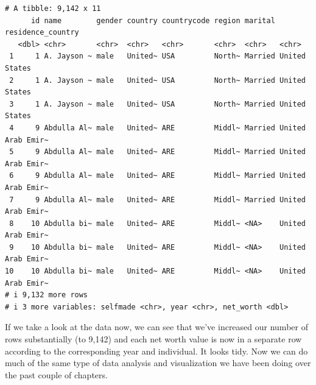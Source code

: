 \documentclass[
  letterpaper,
]{book}
\begin{document}
\begin{verbatim}
# A tibble: 9,142 x 11
      id name        gender country countrycode region marital residence_country
   <dbl> <chr>       <chr>  <chr>   <chr>       <chr>  <chr>   <chr>            
 1     1 A. Jayson ~ male   United~ USA         North~ Married United States    
 2     1 A. Jayson ~ male   United~ USA         North~ Married United States    
 3     1 A. Jayson ~ male   United~ USA         North~ Married United States    
 4     9 Abdulla Al~ male   United~ ARE         Middl~ Married United Arab Emir~
 5     9 Abdulla Al~ male   United~ ARE         Middl~ Married United Arab Emir~
 6     9 Abdulla Al~ male   United~ ARE         Middl~ Married United Arab Emir~
 7     9 Abdulla Al~ male   United~ ARE         Middl~ Married United Arab Emir~
 8    10 Abdulla bi~ male   United~ ARE         Middl~ <NA>    United Arab Emir~
 9    10 Abdulla bi~ male   United~ ARE         Middl~ <NA>    United Arab Emir~
10    10 Abdulla bi~ male   United~ ARE         Middl~ <NA>    United Arab Emir~
# i 9,132 more rows
# i 3 more variables: selfmade <chr>, year <chr>, net_worth <dbl>
\end{verbatim}

If we take a look at the data now, we can see that we've increased our
number of rows substantially (to 9,142) and each net worth value is now
in a separate row according to the corresponding year and individual. It
looks tidy. Now we can do much of the same type of data analysis and
visualization we have been doing over the past couple of chapters.
\end{document}
